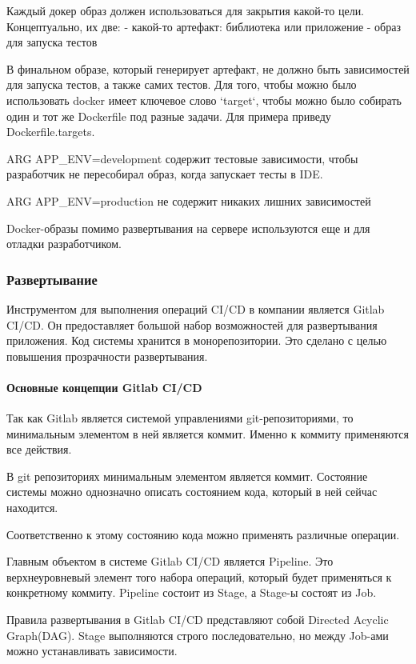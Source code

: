 Каждый докер образ должен использоваться для закрытия какой-то цели. Концептуально, их две:
- какой-то артефакт: библиотека или приложение
- образ для запуска тестов

В финальном образе, который генерирует артефакт, не должно быть зависимостей для запуска тестов,
а также самих тестов.
Для того, чтобы можно было использовать docker имеет ключевое слово `target`, чтобы можно было собирать один
и тот же Dockerfile под разные задачи. Для примера приведу Dockerfile.targets.

ARG APP\_ENV=development содержит тестовые зависимости, чтобы разработчик не пересобирал образ, когда запускает тесты
в IDE.

ARG APP\_ENV=production не содержит никаких лишних зависимостей

Docker-образы помимо развертывания на сервере используются еще и для отладки разработчиком.



\subsubsection{{Развертывание}}

Инструментом для выполнения операций CI/CD в компании является Gitlab CI/CD.
Он предоставляет большой набор возможностей для развертывания приложения.
Код системы хранится в монорепозитории.
Это сделано с целью повышения прозрачности развертывания.


\paragraph{Основные концепции Gitlab CI/CD}

Так как Gitlab является системой управлениями git-репозиториями, то минимальным элементом в ней является коммит.
Именно к коммиту применяются все действия.

В git репозиториях минимальным элементом является коммит.
Состояние системы можно однозначно описать состоянием кода, который в ней сейчас находится.

Соответственно к этому состоянию кода можно применять различные операции.

Главным объектом в системе Gitlab CI/CD является Pipeline. Это верхнеуровневый элемент того набора операций,
который будет применяться к конкретному коммиту.
Pipeline состоит из Stage, а Stage-ы состоят из Job.

Правила развертывания в Gitlab CI/CD представляют собой Directed Acyclic Graph(DAG).
Stage выполняются строго последовательно, но между Job-ами можно устанавливать зависимости.

